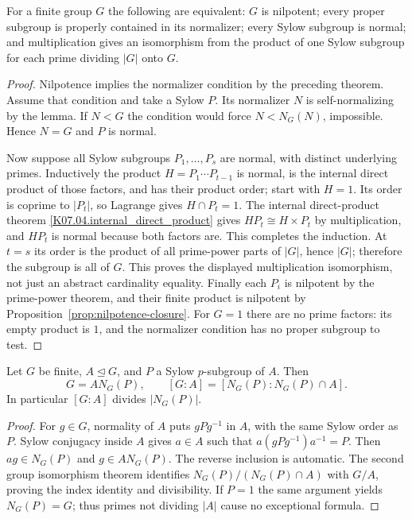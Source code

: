 \begin{theorem}\label{thm:finite-nilpotent-sylow}
For a finite group $G$ the following are equivalent:
$G$ is nilpotent; every proper subgroup is properly contained in its
normalizer; every Sylow subgroup is normal; and multiplication gives an
isomorphism from the product of one Sylow subgroup for each prime
dividing $|G|$ onto $G$.
\end{theorem}
\begin{proof}
Nilpotence implies the normalizer condition by the preceding theorem.
Assume that condition and take a Sylow $P$. Its normalizer $N$ is
self-normalizing by the lemma. If $N<G$ the condition would force
$N<N_G(N)$, impossible. Hence $N=G$ and $P$ is normal.

Now suppose all Sylow subgroups $P_1,\ldots,P_s$ are normal, with
distinct underlying primes. Inductively the product
$H=P_1\cdots P_{t-1}$ is normal, is the internal direct product of
those factors, and has their product order; start with $H=1$.
Its order is coprime to $|P_t|$, so Lagrange gives $H\cap P_t=1$.
The internal direct-product theorem
\ref{K07.04.internal_direct_product} gives
$HP_t\cong H\times P_t$ by multiplication, and $HP_t$ is normal
because both factors are. This completes the induction. At $t=s$ its
order is the product of all prime-power parts of $|G|$, hence $|G|$;
therefore the subgroup is all of $G$. This proves the displayed
multiplication isomorphism, not just an abstract cardinality equality.
Finally each $P_i$ is nilpotent by the prime-power theorem, and their
finite product is nilpotent by Proposition~\ref{prop:nilpotence-closure}.
For $G=1$ there are no prime factors: its empty product is $1$, and
the normalizer condition has no proper subgroup to test.
\end{proof}

\begin{proposition}\label{prop:frattini-argument}
Let $G$ be finite, $A\trianglelefteq G$, and $P$ a Sylow
$p$-subgroup of $A$. Then
\[
 G=A N_G(P),\qquad [G:A]=[N_G(P):N_G(P)\cap A].
\]
In particular $[G:A]$ divides $|N_G(P)|$.
\end{proposition}
\begin{proof}
For $g\in G$, normality of $A$ puts $gPg^{-1}$ in $A$, with the
same Sylow order as $P$. Sylow conjugacy inside $A$ gives $a\in A$
such that $a(gPg^{-1})a^{-1}=P$. Then $ag\in N_G(P)$ and
$g\in A N_G(P)$. The reverse inclusion is automatic. The second
group isomorphism theorem identifies
$N_G(P)/(N_G(P)\cap A)$ with $G/A$, proving the index identity
and divisibility. If $P=1$ the same argument yields $N_G(P)=G$;
thus primes not dividing $|A|$ cause no exceptional formula.
\end{proof}

